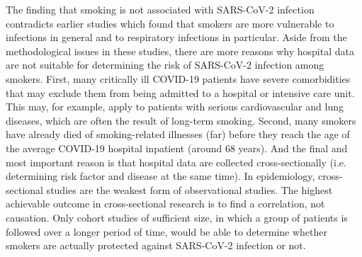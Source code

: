 \documentclass[11pt,a4paper]{article}
\begin{document}
The finding that smoking is not associated with SARS-CoV-2 infection contradicts
earlier studies which found that smokers are more vulnerable to infections in
general and to respiratory infections in particular. Aside from the
methodological issues in these studies, there are more reasons why hospital data
are not suitable for determining the risk of SARS-CoV-2 infection among smokers.
First, many critically ill COVID-19 patients have severe comorbidities that may
exclude them from being admitted to a hospital or intensive care unit. This may,
for example, apply to patients with serious cardiovascular and lung diseases,
which are often the result of long-term smoking. Second, many smokers have
already died of smoking-related illnesses (far) before they reach the age of the
average COVID-19 hospital inpatient (around 68 years). And the final and most
important reason is that hospital data are collected cross-sectionally (i.e.
determining risk factor and disease at the same time). In epidemiology,
cross-sectional studies are the weakest form of observational studies. The
highest achievable outcome in cross-sectional research is to find a correlation,
not causation. Only cohort studies of sufficient size, in which a group of
patients is followed over a longer period of time, would be able to determine
whether smokers are actually protected against SARS-CoV-2 infection or not.

\newpage
\end{document}
